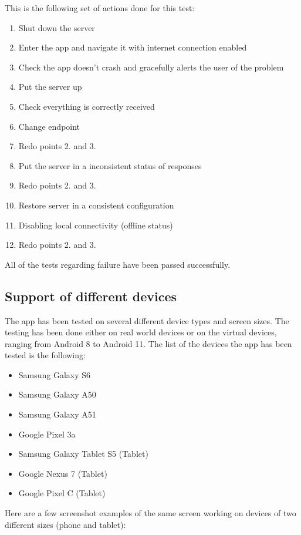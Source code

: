 This is the following set of actions done for this test:
\begin{enumerate}
\item Shut down the server
\item Enter the app and navigate it with internet connection enabled
\item Check the app doesn't crash and gracefully alerts the user of the problem
\item Put the server up
\item Check everything is correctly received 
\item Change endpoint
\item Redo points 2. and 3.
\item Put the server in a inconsistent status of responses
\item Redo points 2. and 3.
\item Restore server in a consistent configuration
\item Disabling local connectivity (offline status)
\item Redo points 2. and 3.
\end{enumerate}
All of the tests regarding failure have been passed successfully.
\newpage
\subsection{Support of different devices}
\hspace{\parindent}The app has been tested on several different device types and screen sizes. The testing has been done either on real world devices or on the virtual devices, ranging from Android 8 to Android 11. The list of the devices the app has been tested is the following:
\begin{itemize}
\item Samsung Galaxy S6
\item Samsung Galaxy A50
\item Samsung Galaxy A51
\item Google Pixel 3a
\item Samsung Galaxy Tablet S5 (Tablet)
\item Google Nexus 7 (Tablet)
\item Google Pixel C (Tablet)
\end{itemize}

Here are a few screenshot examples of the same screen working on devices of two different sizes (phone and tablet):

